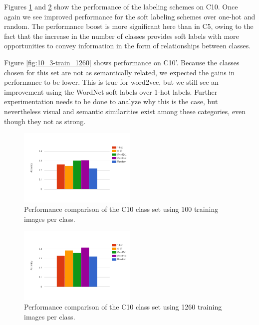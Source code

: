 Figures \ref{fig:10_1-train_100} and \ref{fig:10_1-train_1260} show the
performance of the labeling schemes on C10. Once again we see improved
performance for the soft labeling schemes over one-hot and random. The
performance boost is more significant here than in C5, owing to the fact that
the increase in the number of classes provides soft labels with more
opportunities to convey information in the form of relationships between
classes.

Figure \ref{fig:10_3-train_1260} shows performance on C10'. Because the classes
chosen for this set are not as semantically related, we expected the gains in
performance to be lower. This is true for word2vec, but we still see an
improvement using the WordNet soft labels over 1-hot labels. Further
experimentation needs to be done to analyze why this is the case, but
nevertheless visual and semantic similarities exist among these categories, even
though they not as strong.

\begin{figure}[!tb]
  \centering
  \includegraphics[width=0.5\textwidth]{figs/10_1-train_100.png}
  \caption{
      Performance comparison of the C10 class set using 100 training images
      per class.
  }
  \label{fig:10_1-train_100}
\end{figure}

\begin{figure}[!tb]
  \centering
  \includegraphics[width=0.5\textwidth]{figs/10_1-train_1260.png}
  \caption{
      Performance comparison of the C10 class set using 1260 training images
      per class.
  }
  \label{fig:10_1-train_1260}
\end{figure}

